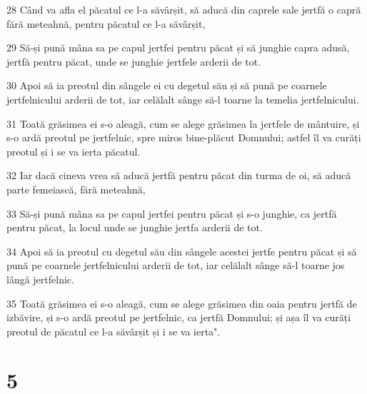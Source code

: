 \par 28 Când va afla el păcatul ce l-a săvârșit, să aducă din caprele sale jertfă o capră fără meteahnă, pentru păcatul ce l-a săvârșit,
\par 29 Să-și pună mâna sa pe capul jertfei pentru păcat și să junghie capra adusă, jertfă pentru păcat, unde se junghie jertfele arderii de tot.
\par 30 Apoi să ia preotul din sângele ei cu degetul său și să pună pe coarnele jertfelnicului arderii de tot, iar celălalt sânge să-l toarne la temelia jertfelnicului.
\par 31 Toată grăsimea ei s-o aleagă, cum se alege grăsimea la jertfele de mântuire, și s-o ardă preotul pe jertfelnic, spre miros bine-plăcut Domnului; astfel îl va curăți preotul și i se va ierta păcatul.
\par 32 Iar dacă cineva vrea să aducă jertfă pentru păcat din turma de oi, să aducă parte femeiască, fără meteahnă,
\par 33 Să-și pună mâna sa pe capul jertfei pentru păcat și s-o junghie, ca jertfă pentru păcat, la locul unde se junghie jertfa arderii de tot.
\par 34 Apoi să ia preotul cu degetul său din sângele acestei jertfe pentru păcat și să pună pe coarnele jertfelnicului arderii de tot, iar celălalt sânge să-l toarne jos lângă jertfelnic.
\par 35 Toată grăsimea ei s-o aleagă, cum se alege grăsimea din oaia pentru jertfă de izbăvire, și s-o ardă preotul pe jertfelnic, ca jertfă Domnului; și așa îl va curăți preotul de păcatul ce l-a săvârșit și i se va ierta".

\chapter{5}

